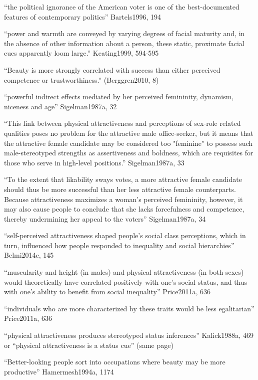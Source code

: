 ``the political ignorance of the American voter is one of the best-documented features of contemporary politics'' Bartels1996, 194

``power and warmth are conveyed by varying degrees of facial maturity and, in the absence of other information about a person, these static, proximate facial cues apparently loom large.'' Keating1999, 594-595

``Beauty is more strongly correlated with success than either perceived competence or trustworthiness.'' (Berggren2010, 8)



``powerful indirect effects mediated by her perceived femininity, dynamism, niceness and age'' Sigelman1987a, 32

``This link between physical attractiveness and perceptions of sex-role related qualities poses no problem for the attractive male office-seeker, but it means that the attractive female candidate may be considered too "feminine" to possess such male-stereotyped strengths as assertiveness and boldness, which are requisites for those who serve in high-level positions.''  Sigelman1987a, 33

``To the extent that likability sways votes, a more attractive female candidate should thus be more successful than her less attractive female counterparts. Because attractiveness maximizes a woman's perceived femininity, however, it may also cause people to conclude that she lacks forcefulness and competence, thereby undermining her appeal to the voters''  Sigelman1987a, 34


``self-perceived attractiveness shaped people's social class perceptions, which in turn, influenced how people responded to inequality and social hierarchies'' Belmi2014c, 145

``muscularity and height (in males) and physical attractiveness (in both sexes) would theoretically have correlated positively with one’s social status, and thus with one's ability to benefit from social inequality'' Price2011a, 636

``individuals who are more characterized by these traits would be less egalitarian'' Price2011a, 636

``physical attractiveness produces stereotyped status inferences'' Kalick1988a, 469 or ``physical attractiveness is a status cue'' (same page)

``Better-looking people sort into occupations where beauty may be more productive'' Hamermesh1994a, 1174

